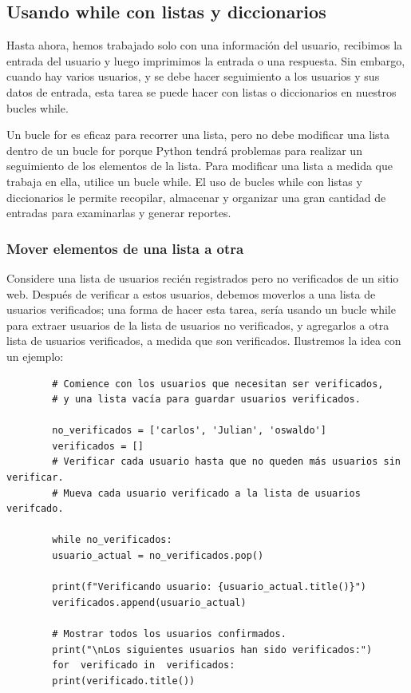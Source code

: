 	
	
	
	
	
	\subsection{Usando {\ttfamily while} con listas y diccionarios}
	
	Hasta ahora, hemos trabajado solo con una información del usuario, recibimos la entrada del usuario y luego imprimimos la entrada o una respuesta. Sin embargo, cuando hay varios usuarios, y se debe hacer seguimiento a los usuarios  y sus  datos de entrada, esta tarea se puede hacer con listas o diccionarios en nuestros bucles {\ttfamily while}.
	
	
	Un bucle {\ttfamily for} es eficaz para recorrer una lista, pero no debe modificar una lista dentro de un bucle {\ttfamily for}  porque Python tendrá problemas para realizar un seguimiento de los elementos de la lista. Para modificar una lista a medida que trabaja en ella, utilice un bucle {\ttfamily while}. El uso de bucles {\ttfamily while} con listas y diccionarios le permite recopilar, almacenar y organizar una gran cantidad de entradas para examinarlas y generar reportes.
	
	\subsubsection{Mover elementos de una lista a otra}
	
	Considere una lista de usuarios recién registrados pero no verificados de un sitio web. Después de verificar a estos usuarios, debemos  moverlos a una lista de usuarios verificados; una forma de hacer esta tarea, sería usando un bucle {\ttfamily while} para extraer usuarios de la lista de usuarios no verificados,  y  agregarlos a otra lista de usuarios verificados, a medida que son verificados. Ilustremos la idea con un ejemplo:
	
	
	\hspace{-2.5cm}{\ttfamily \scriptsize usuarios.py}  \vspace{-0.55cm}
	\begin{lstlisting}		
		# Comience con los usuarios que necesitan ser verificados,
		# y una lista vacía para guardar usuarios verificados.
		
		no_verificados = ['carlos', 'Julian', 'oswaldo']
		verificados = []
		# Verificar cada usuario hasta que no queden más usuarios sin verificar.
		# Mueva cada usuario verificado a la lista de usuarios verifcado.
		
		while no_verificados:
		usuario_actual = no_verificados.pop()
		
		print(f"Verificando usuario: {usuario_actual.title()}")    
		verificados.append(usuario_actual)
		
		# Mostrar todos los usuarios confirmados.
		print("\nLos siguientes usuarios han sido verificados:")
		for  verificado in  verificados:
		print(verificado.title())
		
	\end{lstlisting}	
	
